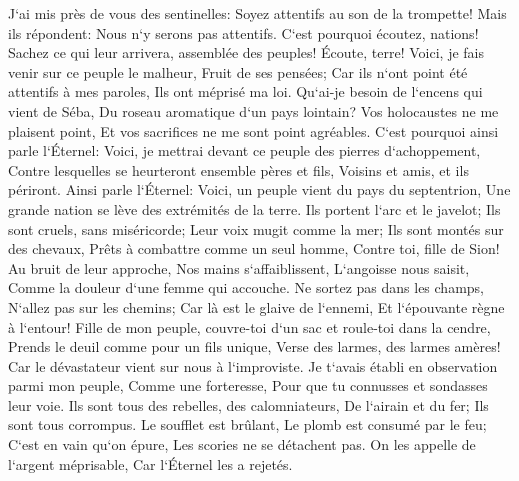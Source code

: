 \verse J`ai mis près de vous des sentinelles: Soyez attentifs au son de la trompette! Mais ils répondent: Nous n`y serons pas attentifs. 
\verse C`est pourquoi écoutez, nations! Sachez ce qui leur arrivera, assemblée des peuples! 
\verse Écoute, terre! Voici, je fais venir sur ce peuple le malheur, Fruit de ses pensées; Car ils n`ont point été attentifs à mes paroles, Ils ont méprisé ma loi. 
\verse Qu`ai-je besoin de l`encens qui vient de Séba, Du roseau aromatique d`un pays lointain? Vos holocaustes ne me plaisent point, Et vos sacrifices ne me sont point agréables. 
\verse C`est pourquoi ainsi parle l`Éternel: Voici, je mettrai devant ce peuple des pierres d`achoppement, Contre lesquelles se heurteront ensemble pères et fils, Voisins et amis, et ils périront. 
\verse Ainsi parle l`Éternel: Voici, un peuple vient du pays du septentrion, Une grande nation se lève des extrémités de la terre. 
\verse Ils portent l`arc et le javelot; Ils sont cruels, sans miséricorde; Leur voix mugit comme la mer; Ils sont montés sur des chevaux, Prêts à combattre comme un seul homme, Contre toi, fille de Sion! 
\verse Au bruit de leur approche, Nos mains s`affaiblissent, L`angoisse nous saisit, Comme la douleur d`une femme qui accouche. 
\verse Ne sortez pas dans les champs, N`allez pas sur les chemins; Car là est le glaive de l`ennemi, Et l`épouvante règne à l`entour! 
\verse Fille de mon peuple, couvre-toi d`un sac et roule-toi dans la cendre, Prends le deuil comme pour un fils unique, Verse des larmes, des larmes amères! Car le dévastateur vient sur nous à l`improviste. 
\verse Je t`avais établi en observation parmi mon peuple, Comme une forteresse, Pour que tu connusses et sondasses leur voie. 
\verse Ils sont tous des rebelles, des calomniateurs, De l`airain et du fer; Ils sont tous corrompus. 
\verse Le soufflet est brûlant, Le plomb est consumé par le feu; C`est en vain qu`on épure, Les scories ne se détachent pas. 
\verse On les appelle de l`argent méprisable, Car l`Éternel les a rejetés. 

